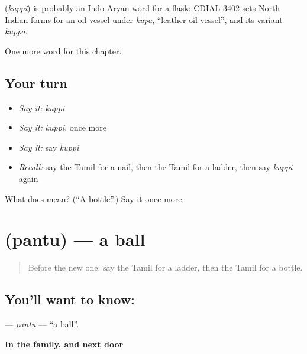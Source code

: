 \begin{cousinweb}
\textbf{} (\emph{kuppi}) is probably an Indo-Aryan word for a flask: CDIAL 3402 sets North Indian forms for an oil vessel under \emph{kūpa}, \textquotedblleft{}leather oil vessel\textquotedblright{}, and its variant \emph{kuppa}.
\end{cousinweb}

\begin{grammarlens}[title={What you've built}]
One more word for this chapter.
\end{grammarlens}

\subsection*{Your turn}
\begin{itemize}
\raggedright
  \item \emph{Say it:} \emph{kuppi}
  \item \emph{Say it:} \emph{kuppi}, once more
  \item \emph{Say it:} say \emph{kuppi}
  \item \emph{Recall:} say the Tamil for a nail, then the Tamil for a ladder, then say \emph{kuppi} again
\end{itemize}

\begin{tcolorbox}[breakable,colback=teal!4,colframe=teal!35!black,title={Before you move on}]
What does  mean? (\textquotedblleft{}A bottle\textquotedblright{}.) Say it once more.
\end{tcolorbox}
\section[\texorpdfstring{\ta{பந்து} (pantu)}{பந்து (pantu)}]{ (pantu) — a ball}

\label{lesson:TA-C136-pantu}



\begin{quote}
Before the new one: say the Tamil for a ladder, then the Tamil for a bottle.
\end{quote}

\subsection*{You'll want to know: }
\textbf{} — \emph{pantu} — \textquotedblleft{}a ball\textquotedblright{}.

\textbf{In the family, and next door}


